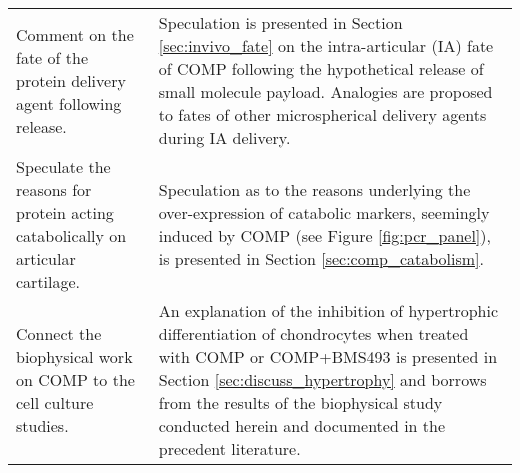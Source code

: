 \begin{landscape}
\begin{table}[h!]
\begin{tabular}{ p{} p{} }
    Comment on the fate of the protein delivery agent following release.
    &
    Speculation is presented in Section \ref{sec:invivo_fate} on the
    intra-articular (IA) fate of COMP following the hypothetical release of
    small molecule payload. Analogies are proposed to fates of other
    microspherical delivery agents during IA delivery.
    \\

    Speculate the reasons for protein acting catabolically on articular
    cartilage.
    &
    Speculation as to the reasons underlying the over-expression of catabolic
    markers, seemingly induced by COMP (see Figure \ref{fig:pcr_panel}), is
    presented in Section \ref{sec:comp_catabolism}.
    \\

    Connect the biophysical work on COMP to the cell culture studies.
    &
    An explanation of the inhibition of hypertrophic differentiation of
    chondrocytes when treated with COMP or COMP+BMS493 is presented in Section
    \ref{sec:discuss_hypertrophy} and borrows from the results of the
    biophysical study conducted herein and documented in the precedent
    literature.
    \\

    \hline
\end{tabular}
\end{table}
\end{landscape}
\renewcommand{\arraystretch}{1}


